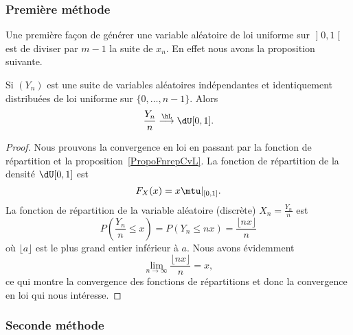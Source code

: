 \subsubsection{Première méthode}

Une première façon de générer une variable aléatoire de loi uniforme sur \( \mathopen] 0 , 1 \mathclose[\) est de diviser par \( m-1\) la suite de \( x_n\). En effet nous avons la proposition suivante.

\begin{proposition}
	Si \( (Y_n)\) est une suite de variables aléatoires indépendantes et identiquement distribuées de loi uniforme sur \( \{ 0,\ldots,n-1 \}\). Alors
	\begin{equation}
		\frac{ Y_n }{ n }\stackrel{\hL}{\longrightarrow}\dU\mathopen[ 0 , 1 \mathclose].
	\end{equation}
\end{proposition}

\begin{proof}
	Nous prouvons la convergence en loi en passant par la fonction de répartition et la proposition~\ref{PropoFnrepCvL}. La fonction de répartition de la densité \( \dU[0,1]\) est
	\begin{equation}
		F_X(x)=x\mtu|_{\mathopen[ 0 , 1 \mathclose]}.
	\end{equation}
	La fonction de répartition de la variable aléatoire (discrète) \( X_n=\frac{ Y_n }{ n }\) est
	\begin{equation}
		P(\frac{ Y_n }{ n }\leq x)=P(Y_n\leq nx)=\frac{ \lfloor nx \rfloor }{ n }
	\end{equation}
	où \( \lfloor a\rfloor\) est le plus grand entier inférieur à \( a\). Nous avons évidemment
	\begin{equation}
		\lim_{n\to \infty} \frac{ \lfloor nx\rfloor }{ n }=x,
	\end{equation}
	ce qui montre la convergence des fonctions de répartitions et donc la convergence en loi qui nous intéresse.
\end{proof}

\subsubsection{Seconde méthode}

